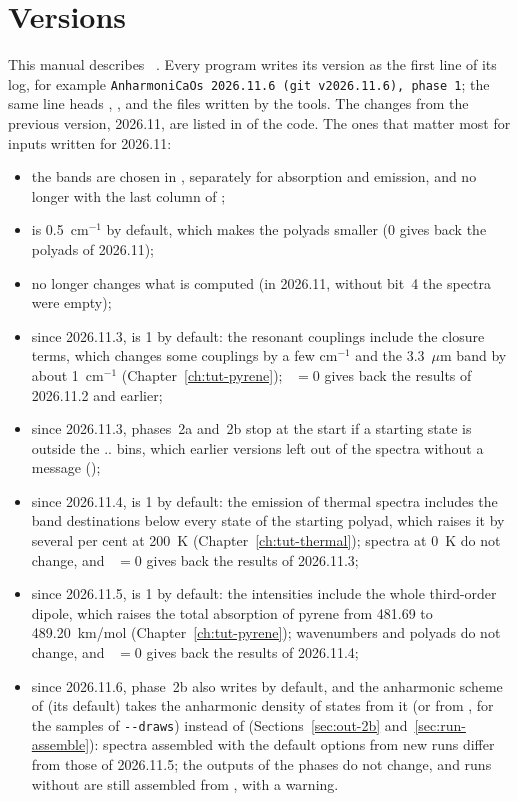 \section{Versions}

This manual describes \ac{}~\acversion{}. Every program writes its version
as the first line of its log, for example
\texttt{AnharmoniCaOs 2026.11.6 (git v2026.11.6), phase 1}; the same line
heads , ,  and
the files written by the tools. The changes from the previous version,
2026.11, are listed in  of the code. The ones that matter
most for inputs written for 2026.11:
\begin{itemize}
\item the bands are chosen in , separately for absorption
  and emission, and no longer with the last column of ;
\item {} is 0.5~cm$^{-1}$ by default, which makes the
  polyads smaller (0 gives back the polyads of 2026.11);
\item {} no longer changes what is computed (in 2026.11,
  without bit~4 the spectra were empty);
\item since 2026.11.3,  is 1 by
  default: the resonant couplings include the closure terms, which
  changes some couplings by a few cm$^{-1}$ and the 3.3~$\mu$m band by
  about 1~cm$^{-1}$ (Chapter~\ref{ch:tut-pyrene}); ~$=0$
  gives back the results of 2026.11.2 and earlier;
\item since 2026.11.3, phases~2a and~2b stop at the
  start if a starting state is outside the ..
  bins, which earlier versions left out of the spectra without a message
  ();
\item since 2026.11.4,  is 1 by default: the
  emission of thermal spectra includes the band destinations below every
  state of the starting polyad, which raises it by several per cent at
  200~K (Chapter~\ref{ch:tut-thermal}); spectra at 0~K do not change, and
  ~$=0$ gives back the results of 2026.11.3;
\item since 2026.11.5,  is 1 by default: the intensities
  include the whole third-order dipole, which raises the total absorption
  of pyrene from 481.69 to 489.20~km/mol (Chapter~\ref{ch:tut-pyrene});
  wavenumbers and polyads do not change, and ~$=0$ gives
  back the results of 2026.11.4;
\item since 2026.11.6, phase~2b also writes  by default,
  and the anharmonic scheme of  (its default) takes
  the anharmonic density of states from it (or from , for
  the samples of  \texttt{-{}-draws}) instead of
   (Sections~\ref{sec:out-2b} and~\ref{sec:run-assemble}):
  spectra assembled with the default options from new runs differ from
  those of 2026.11.5; the outputs of the phases do not change, and runs
  without  are still assembled from ,
  with a warning.
\end{itemize}

